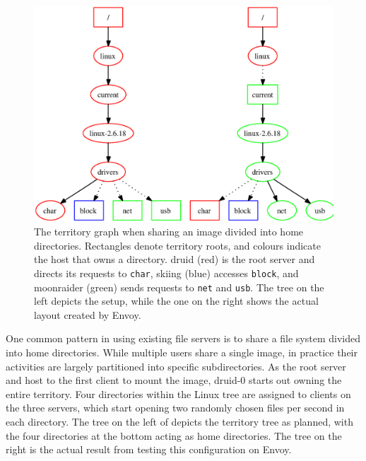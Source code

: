 \begin{figure}[t]
\centering
\includegraphics[width=\figwidth]{figures/territory-home}
\caption[Territory graph for home directory sharing]{The territory graph when sharing an image divided into home directories. Rectangles denote territory roots, and colours indicate the host that owns a directory. druid (red) is the root server and directs its requests to \texttt{char}, skiing (blue) accesses \texttt{block}, and moonraider (green) sends requests to \texttt{net} and \texttt{usb}. The tree on the left depicts the setup, while the one on the right shows the actual layout created by Envoy.}
\label{fig:territory-home}
\end{figure}

One common pattern in using existing file servers is to share a file system divided into home directories. While multiple users share a single image, in practice their activities are largely partitioned into specific subdirectories. As the root server and host to the first client to mount the image, druid-0 starts out owning the entire territory. Four directories within the Linux tree are assigned to clients on the three servers, which start opening two randomly chosen files per second in each directory. The tree on the left of  depicts the territory tree as planned, with the four directories at the bottom acting as home directories. The tree on the right is the actual result from testing this configuration on Envoy.


